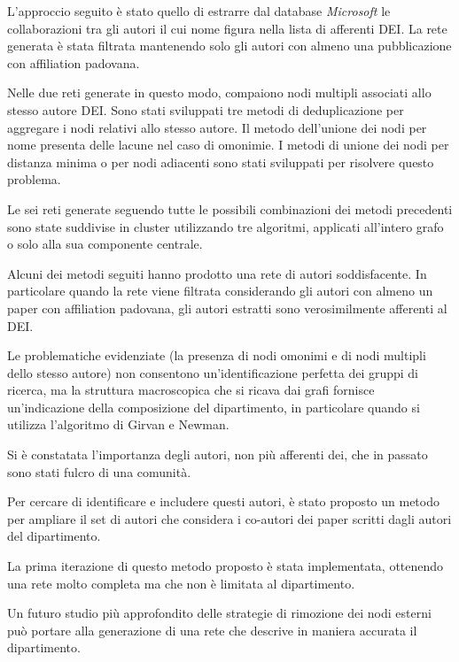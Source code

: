 \documentclass[12pt,a4paper,twoside]{report}
\begin{document}
L'approccio seguito è stato quello di estrarre dal database \textit{Microsoft} le collaborazioni tra
gli autori il cui nome figura nella lista di afferenti DEI. La rete generata è stata filtrata
mantenendo solo gli autori con almeno una pubblicazione con affiliation padovana.

Nelle due reti generate in questo modo, compaiono nodi multipli associati allo stesso autore DEI.
Sono stati sviluppati tre metodi di deduplicazione per aggregare i nodi relativi allo stesso autore.
Il metodo dell'unione dei nodi per nome presenta delle lacune nel caso di omonimie. I metodi di
unione dei nodi per distanza minima o per nodi adiacenti sono stati sviluppati per risolvere questo
problema.

Le sei reti generate seguendo tutte le possibili combinazioni dei metodi precedenti sono state
suddivise in cluster utilizzando tre algoritmi, applicati all'intero grafo o solo alla sua
componente centrale.

Alcuni dei metodi seguiti hanno prodotto una rete di autori soddisfacente. In particolare quando la
rete viene filtrata considerando gli autori con almeno un paper con affiliation padovana, gli autori
estratti sono verosimilmente afferenti al DEI.

Le problematiche evidenziate (la presenza di nodi omonimi e di nodi multipli dello stesso autore)
non consentono un'identificazione perfetta dei gruppi di ricerca, ma la struttura macroscopica che
si ricava dai grafi fornisce un'indicazione della composizione del dipartimento, in particolare
quando si utilizza l'algoritmo di Girvan e Newman.

Si è constatata l'importanza degli autori, non più afferenti dei, che in passato sono stati fulcro
di una comunità.

Per cercare di identificare e includere questi autori, è stato proposto un metodo per ampliare il
set di autori che considera i co-autori dei paper scritti dagli autori del dipartimento.

La prima iterazione di questo metodo proposto è stata implementata, ottenendo una rete molto
completa ma che non è limitata al dipartimento.

Un futuro studio più approfondito delle strategie di rimozione dei nodi esterni può portare alla
generazione di una rete che descrive in maniera accurata il dipartimento.








\end{document}
